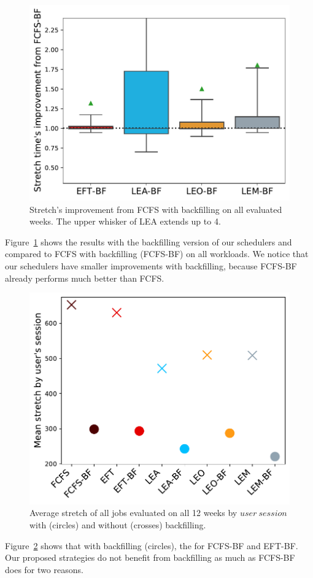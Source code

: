 \documentclass[sigconf,review,anonymous]{acmart}
\newcommand{\rev}[1]{{\color{black}{#1}}}
\newcommand{\us}{\ensuremath{\mathit{user~session}}\xspace}
\begin{document}
\paragraph{\rev{Results with backfilling}}
\begin{figure}[t]\centering\includegraphics[width=0.9\linewidth]{../MBSS/plot/Boxplot/byuser/box_plot_bf_stretch_all-all_1.pdf}\caption{Stretch's improvement from FCFS with backfilling on all evaluated weeks. The upper whisker of LEA extends up to 4.}\label{boxplot.all_bf}\end{figure}
Figure~\ref{boxplot.all_bf} shows the results with the backfilling version of our
schedulers and compared to FCFS with backfilling (FCFS-BF) on all workloads.
We notice that our schedulers have smaller improvements with
backfilling, because FCFS-BF already performs much better than FCFS.
\begin{figure}[t]\centering\includegraphics[width=0.9\linewidth]{../MBSS/plot/byuser/Mean_stretch_with_and_without_bf_all-all.pdf}\caption{Average stretch of all jobs evaluated on all 12 weeks by \us with (circles) and without (crosses) backfilling.}\label{bf_vs_non_bf}\end{figure}
Figure~\ref{bf_vs_non_bf} shows that
with backfilling (circles),
the \rev{difference of performance with or without backfilling is much higher} for FCFS-BF and EFT-BF. 
Our proposed strategies do not benefit from backfilling as much as FCFS-BF does for two reasons.
\end{document}
